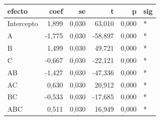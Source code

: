 \begin{tabular}{lrrrrl}
\toprule
efecto & coef & se & t & p & sig \\
\midrule
Intercepto &                 1,899 &                   0,030 &               63,010 &                     0,000 & * \\
A &                 -1,775 &                   0,030 &               -58,897 &                     0,000 & * \\
B &                 1,499 &                   0,030 &                49,721 &                     0,000 & * \\
C &                 -0,667 &                   0,030 &                -22,121 &                    0,000 & * \\
AB &                 -1,427 &                   0,030 &               -47,336 &                    0,000 & * \\
AC &                0,630 &                  0,030 &                20,912 &                     0,000 & * \\
BC &                 -0,533 &                  0,030 &                -17,685 &                    0,000 & * \\
ABC &                0,511 &                  0,030 &                16,949 &                    0,000 & * \\
\bottomrule
\end{tabular}

